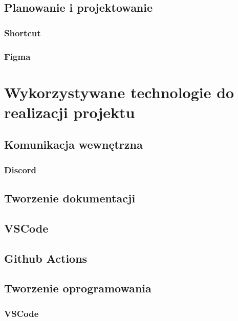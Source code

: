 \subsection{Planowanie i projektowanie}

\subsubsection{Shortcut}

\subsubsection{Figma}


\section{Wykorzystywane technologie do realizacji projektu}

\subsection{Komunikacja wewnętrzna}

\subsubsection{Discord}


\subsection{Tworzenie dokumentacji}

\subsection{VSCode}

\subsection{Github Actions}


\subsection{Tworzenie oprogramowania}

\subsubsection{VSCode}


